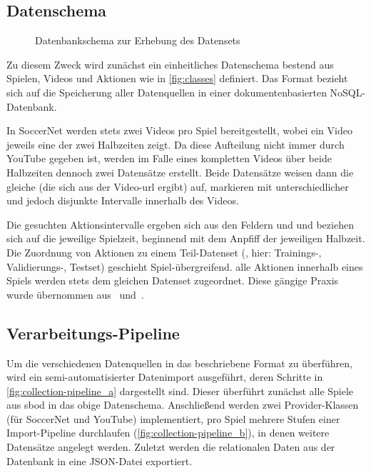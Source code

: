 \subsection{Datenschema}
\label{subsec:schema}

\begin{figure}
    \centering
    \caption{Datenbankschema zur Erhebung des Datensets}
    \label{fig:classes}
\end{figure}

Zu diesem Zweck wird zunächst ein einheitliches Datenschema bestend aus Spielen, Videos und Aktionen wie in \autoref{fig:classes} definiert.
Das Format bezieht sich auf die Speicherung aller Datenquellen in einer dokumentenbasierten NoSQL-Datenbank.

In SoccerNet werden stets zwei Videos pro Spiel bereitgestellt, wobei ein Video jeweils eine der zwei Halbzeiten zeigt.
Da diese Aufteilung nicht immer durch YouTube gegeben ist, werden im Falle eines kompletten Videos über beide Halbzeiten dennoch zwei Datensätze erstellt.
Beide Datensätze weisen dann die gleiche  (die sich aus der Video-\gls{url} ergibt) auf, markieren mit unterschiedlicher  und  jedoch disjunkte Intervalle innerhalb des Videos.

Die gesuchten Aktionsintervalle ergeben sich aus den Feldern  und  und beziehen sich auf die jeweilige Spielzeit, beginnend mit dem Anpfiff der jeweiligen Halbzeit.
Die Zuordnung von Aktionen zu einem Teil-Datenset (, hier: Trainings-, Validierungs-, Testset) geschieht Spiel-übergreifend.
\Dh alle Aktionen innerhalb eines Spiels werden stets dem gleichen Datenset zugeordnet.
Diese gängige Praxis wurde übernommen aus~\cite{Giancola18} und~\cite{Jiang19}.

\subsection{Verarbeitungs-Pipeline}
\label{subsec:pipeline}

Um die verschiedenen Datenquellen in das beschriebene Format zu überführen, wird ein semi-automatisierter Datenimport ausgeführt, deren Schritte in \autoref{fig:collection-pipeline_a} dargestellt sind.
Dieser überführt zunächst alle Spiele aus \gls{sbod} in das obige Datenschema.
Anschließend werden zwei Provider-Klassen (für SoccerNet und YouTube) implementiert, pro Spiel mehrere Stufen einer Import-Pipeline durchlaufen (\autoref{fig:collection-pipeline_b}), in denen weitere Datensätze angelegt werden.
Zuletzt werden die relationalen Daten aus der Datenbank in eine JSON-Datei exportiert.

